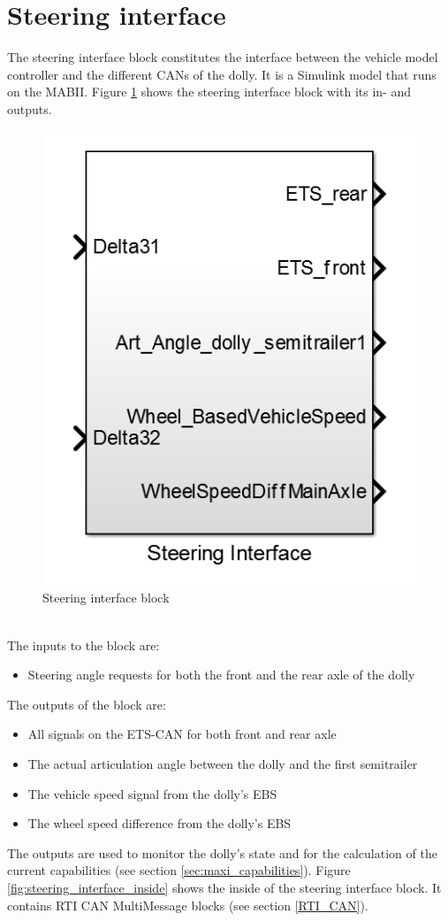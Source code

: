 \documentclass[ExampleMasters.tex]{subfiles}
\begin{document}
\section{Steering interface}
\label{sec:steering_interface}
The steering interface block constitutes the interface between the vehicle model controller and the different CANs of the dolly. It is a Simulink model that runs on the MABII.
Figure \ref{fig:steering_interface} shows the steering interface block with its in- and outputs. 
\begin{figure}[h]
	\centering
	\includegraphics[width=0.5\linewidth]{figures/steering_interface}
	
	\caption{Steering interface block}
	\label{fig:steering_interface}
\end{figure} \\
The inputs to the block are:
\begin{itemize}
	\item Steering angle requests for both the front and  the rear axle of the dolly 
\end{itemize} 
 The outputs of the block are:
 \begin{itemize}
 	\item All signals on the ETS-CAN for both front and rear axle
 	\item The actual articulation angle between the dolly and the first semitrailer
 	\item The vehicle speed signal from the dolly's EBS
 	\item The wheel speed difference from the dolly's EBS
 \end{itemize}
 The outputs are used to monitor the dolly's state and for the calculation of the current capabilities (see section \ref{sec:maxi_capabilities}).
 Figure \ref{fig:steering_interface_inside} shows the inside of the steering interface block. It contains RTI CAN MultiMessage blocks (see section \ref{RTI_CAN}).   
 
\end{document}
